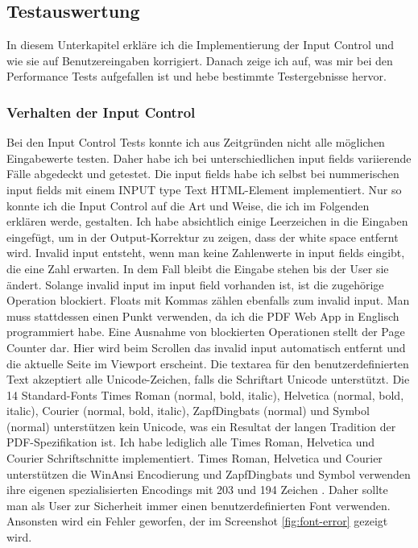\subsection{Testauswertung}
In diesem Unterkapitel erkläre ich die Implementierung der Input Control und wie sie auf Benutzereingaben korrigiert. Danach zeige ich auf, was mir bei den Performance Tests aufgefallen ist und hebe bestimmte Testergebnisse hervor.

\subsubsection{Verhalten der Input Control}
Bei den Input Control Tests konnte ich aus Zeitgründen nicht alle möglichen Eingabewerte testen. Daher habe ich bei unterschiedlichen input fields variierende Fälle abgedeckt und getestet. Die input fields habe ich selbst bei nummerischen input fields mit einem INPUT type Text HTML-Element implementiert. Nur so konnte ich die Input Control auf die Art und Weise, die ich im Folgenden erklären werde, gestalten. Ich habe absichtlich einige Leerzeichen in die Eingaben eingefügt, um in der Output-Korrektur zu zeigen, dass der white space entfernt wird. Invalid input entsteht, wenn man keine Zahlenwerte in input fields eingibt, die eine Zahl erwarten. In dem Fall bleibt die Eingabe stehen bis der User sie ändert. Solange invalid input im input field vorhanden ist, ist die zugehörige Operation blockiert. Floats mit Kommas zählen ebenfalls zum invalid input. Man muss stattdessen einen Punkt verwenden, da ich die PDF Web App in Englisch programmiert habe. Eine Ausnahme von blockierten Operationen stellt der Page Counter dar. Hier wird beim Scrollen das invalid input automatisch entfernt und die aktuelle Seite im Viewport erscheint. Die textarea für den benutzerdefinierten Text akzeptiert alle Unicode-Zeichen, falls die Schriftart Unicode unterstützt. Die 14 Standard-Fonts Times Roman (normal, bold, italic), Helvetica (normal, bold, italic), Courier (normal, bold, italic), ZapfDingbats (normal) und Symbol (normal) unterstützen kein Unicode, was ein Resultat der langen Tradition der PDF-Spezifikation ist. Ich habe lediglich alle Times Roman, Helvetica und Courier Schriftschnitte implementiert. Times Roman, Helvetica und Courier unterstützen die WinAnsi Encodierung und ZapfDingbats und Symbol verwenden ihre eigenen spezialisierten Encodings mit 203 und 194 Zeichen \cite{pdf-lib}. Daher sollte man als User zur Sicherheit immer einen benutzerdefinierten Font verwenden. Ansonsten wird ein Fehler geworfen, der im Screenshot \ref{fig:font-error} gezeigt wird.

